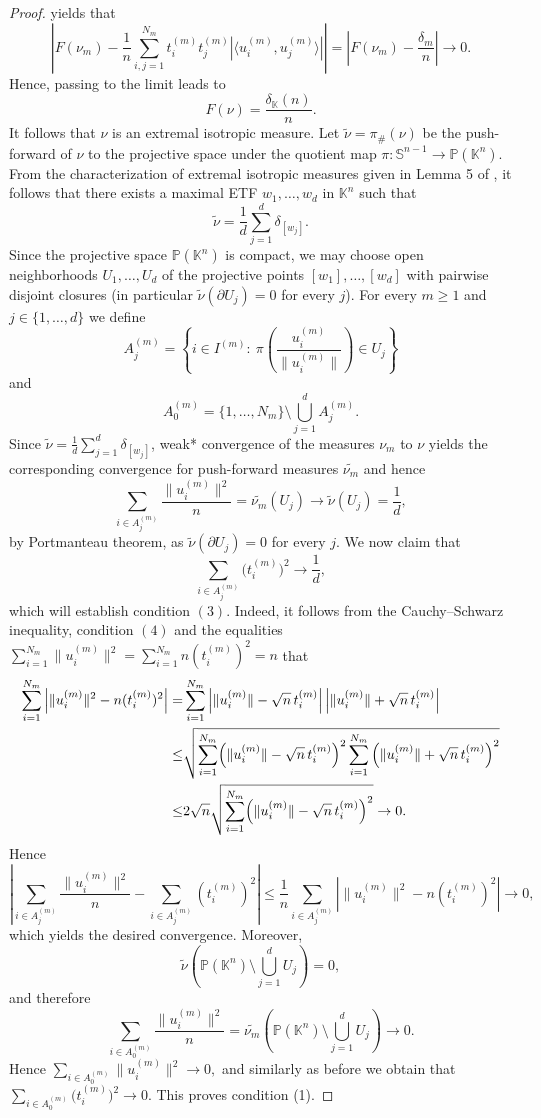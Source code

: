 \documentclass[12pt, reqno]{amsart}
\theoremstyle{definition}
\theoremstyle{remark}
\numberwithin{equation}{section}
\begin{document}
\begin{proof}
yields that
$$\left | F(\nu_m) - \frac1n \sum_{i,j=1}^{N_m} t_i^{(m)}t_j^{(m)} |\langle u_i^{(m)},u_j^{(m)}\rangle| \right | = \left | F(\nu_m) - \frac{\delta_m}{n} \right | \to 0.$$
Hence, passing to the limit leads to
$$ F(\nu) = \frac{\delta_{\mathbb K}(n)}{n}.$$ 
It follows that $\nu$ is an extremal isotropic measure. Let $ \widetilde\nu = \pi_\#(\nu) $ be the push-forward of $\nu$ to the projective space under the quotient map $ \pi:\mathbb S^{n-1}\to\mathbb P(\mathbb K^n)$. From the characterization of extremal isotropic measures given in Lemma 5 of \cite{bukhcox}, it follows that there exists a maximal ETF $ w_1,\ldots,w_d$ in  $\mathbb{K}^n $ such that
$$ \widetilde\nu = \frac1d \sum_{j=1}^{d}\delta_{[w_j]}. $$ 
Since the projective space $\mathbb P(\mathbb K^n)$ is compact, we may choose open neighborhoods $ U_1,\ldots,U_d $ of the projective points $ [w_1],\ldots,[w_d]$ with pairwise disjoint closures (in particular $\widetilde\nu(\partial U_j)=0$ for every $j$). For every $m\geq 1$ and $j \in \{1, \ldots, d\}$ we define 
$$ A_j^{(m)} = \left\{ i\in I^{(m)}: \ \pi\!\left( \frac{u_i^{(m)}}{\|u_i^{(m)}\|} \right)\in U_j \right\}$$ 
and 
$$ A_0^{(m)} = \{1,\ldots,N_m\} \setminus \bigcup_{j=1}^{d}A_j^{(m)}.$$
Since $\widetilde{\nu}=\frac1d\sum_{j=1}^{d}\delta_{[w_j]}$, weak* convergence of the measures $\nu_m$ to $\nu$ yields the corresponding convergence for push-forward measures $\widetilde{\nu_m}$ and hence
$$ \sum_{i\in A_j^{(m)}} \frac{\|u_i^{(m)}\|^2}{n} = \widetilde{\nu_m}(U_j) \to \widetilde{\nu}(U_j) = \frac1d, $$
by Portmanteau theorem, as $\widetilde\nu(\partial U_j)=0$ for every $j$. We now claim that
$$ \sum_{i\in A_j^{(m)}} \bigl(t_i^{(m)}\bigr)^2 \to \frac1d, $$ 
which will establish condition $(3)$. Indeed, it follows from the Cauchy--Schwarz inequality, condition $(4)$ and the equalities $\sum_{i=1}^{N_m} \|u_i^{(m)}\|^2 = \sum_{i=1}^{N_m} n(t_i^{(m)})^2=n$ that
\begin{align*}
\sum_{i=1}^{N_m} \left| \|u_i^{(m)}\|^2 - n(t_i^{(m)})^2 \right| =& \sum_{i=1}^{N_m} \left| \|u_i^{(m)}\|-\sqrt n\,t_i^{(m)} \right| \left| \|u_i^{(m)}\|+\sqrt n\,t_i^{(m)} \right| \\
\leq& \sqrt{\sum_{i=1}^{N_m} \Bigl( \|u_i^{(m)}\|-\sqrt n\,t_i^{(m)} \Bigr)^2 \sum_{i=1}^{N_m} \left ( \|u_i^{(m)}\|+\sqrt n\,t_i^{(m)} \right )^2 } \\
\leq& 2\sqrt{n} \sqrt{\sum_{i=1}^{N_m} \Bigl( \|u_i^{(m)}\|-\sqrt n\,t_i^{(m)} \Bigr)^2} \to 0.
\end{align*}
Hence
$$\left | \sum_{i\in A_j^{(m)}} \frac{\|u_i^{(m)}\|^2}{n} - \sum_{i\in A_j^{(m)}} (t_i^{(m)})^2 \right | \leq \frac{1}{n} \sum_{i\in A_j^{(m)}} \left| \|u_i^{(m)}\|^2 - n(t_i^{(m)})^2 \right| \to 0 ,$$
which yields the desired convergence.  Moreover, 
$$ \widetilde{\nu}\!\left( \mathbb P(\mathbb K^n) \setminus \bigcup_{j=1}^{d}U_j \right) =0, $$
and therefore 
$$ \sum_{i\in A_0^{(m)}} \frac{\|u_i^{(m)}\|^2}{n} = \widetilde{\nu_m}\!\left( \mathbb P(\mathbb K^n) \setminus \bigcup_{j=1}^{d}U_j \right) \to 0. $$ Hence $ \sum_{i\in A_0^{(m)}}\|u_i^{(m)}\|^2\to0, $ and similarly as before we obtain that $ \sum_{i\in A_0^{(m)}} \bigl(t_i^{(m)}\bigr)^2 \to 0$. This proves condition (1).


\end{proof}
\end{document}
